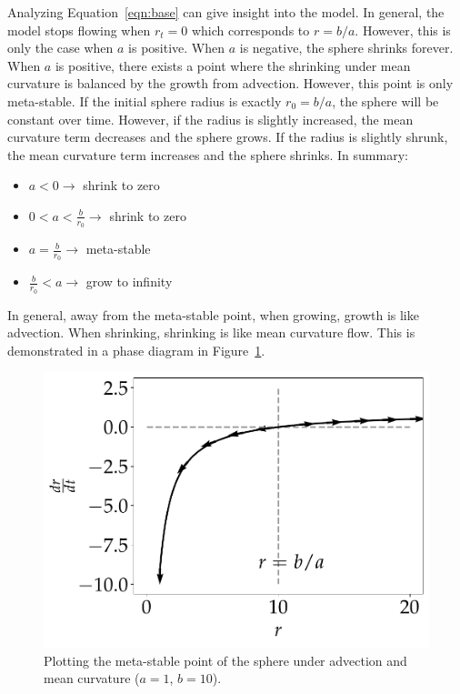 \documentclass[journal]{IEEEtran}
\begin{document}
Analyzing Equation~\ref{eqn:base} can give insight into the model.
In general, the model stops flowing when $r_t = 0$ which corresponds to $r = b/a$.
However, this is only the case when $a$ is positive.
When $a$ is negative, the sphere shrinks forever.
When $a$ is positive, there exists a point where the shrinking under mean curvature is balanced by the growth from advection.
However, this point is only meta-stable.
If the initial sphere radius is exactly $r_0 = b/a$, the sphere will be constant over time.
However, if the radius is slightly increased, the mean curvature term decreases and the sphere grows.
If the radius is slightly shrunk, the mean curvature term increases and the sphere shrinks.
In summary:
\begin{itemize}
  \item $a < 0 \rightarrow$ shrink to zero
  \item $0 < a < \frac{b}{r_0} \rightarrow $ shrink to zero
  \item $ a = \frac{b}{r_0} \rightarrow $ meta-stable
  \item $\frac{b}{r_0} < a \rightarrow $ grow to infinity
\end{itemize}
In general, away from the meta-stable point, when growing, growth is like advection. When shrinking, shrinking is like mean curvature flow.
This is demonstrated in a phase diagram in Figure~\ref{fig:loss}.

\begin{figure}[b]
  \centering
    \includegraphics[width=0.9\linewidth]{loss}%
  \caption{Plotting the meta-stable point of the sphere under advection and mean curvature ($a = 1$, $b = 10$).}
  \label{fig:loss}
\end{figure}
\end{document}
